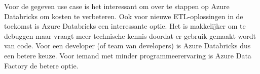 Voor de gegeven use case is het interessant om over te stappen op Azure Databricks om kosten te verbeteren. Ook voor nieuwe ETL-oplossingen in de toekomst is Azure Databricks een interessante optie. Het is makkelijker om te debuggen maar vraagt meer technische kennis doordat er gebruik gemaakt wordt van code. Voor een developer (of team van developers) is Azure Databricks dus een betere keuze. Voor iemand met minder programmeerervaring is Azure Data Factory de betere optie.









